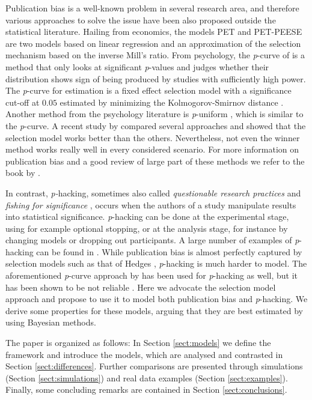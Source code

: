 \documentclass[preprint, authoryear]{elsarticle}
\theoremstyle{plain}
\theoremstyle{definition}
\begin{document}
Publication bias is a well-known problem in several research area, and therefore various approaches to solve the issue have been also proposed outside the statistical literature. Hailing from economics, the models PET and PET-PEESE \citep{stanley2014meta,stanley2017limitations} are two models based on linear regression and an approximation of the selection mechanism based on the inverse Mill's ratio. From psychology, the \emph{p}-curve of \citet{simonsohn2014p} is a method that only looks at significant \emph{p}-values and judges whether their distribution shows sign of being produced by studies with sufficiently high power. The \emph{p}-curve for estimation \citep{simonsohn2014} is a fixed effect selection model with a significance cut-off at $0.05$ estimated by minimizing the Kolmogorov-Smirnov distance \citep{mcshane2016adjusting}. Another method from the psychology literature is \emph{p}-uniform \citep{van2015meta}, which is similar to the \emph{p}-curve. A recent study by \citet{carter2019correcting} compared several approaches and showed that the selection model works better than the others. Nevertheless, not even the winner method works really well in every considered scenario. For more information on publication bias and a good review of large part of these methods we refer to the book by \citet{rothstein2006publication}.

In contrast, \emph{p-}hacking, sometimes also called \emph{questionable research practices} \citep{Sijtsma2016} and \emph{fishing for significance} \citep{Boulesteix2009}, occurs when the authors of a study manipulate results into statistical significance. \emph{p}-hacking can be done at the experimental stage, using for example optional stopping, or at the analysis stage, for instance by changing models or dropping out participants. A large number of examples of \emph{p}-hacking can be found in \citet{simmons2011false}. While publication bias is almost perfectly captured by selection models such as that of Hedges \citeyearpar{hedges1992modeling}, \emph{p}-hacking is much harder to model. The aforementioned \emph{p}-curve approach by \citet{simonsohn2014p} has been used for \emph{p}-hacking as well, but it has been shown to be not reliable \citep{BrunsIoannidis2016}. Here we advocate the selection model approach and propose to use it to model both publication bias and \emph{p}-hacking. We derive some properties for these models, arguing that they are best estimated by using Bayesian methods. 

The paper is organized as follows: In Section \ref{sect:models} we define the framework and introduce the models, which are analysed and contrasted in Section \ref{sect:differences}. Further comparisons are presented through simulations (Section \ref{sect:simulations}) and real data examples (Section \ref{sect:examples}). Finally, some concluding remarks are contained in Section \ref{sect:conclusions}.
\end{document}
